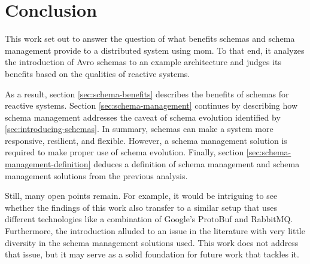 
\section{Conclusion}\label{sec:conclusion}

This work set out to answer the question of what benefits schemas and schema management provide to a distributed system using \gls{mom}.
To that end, it analyzes the introduction of Avro schemas to an example architecture and judges its benefits based on the qualities of reactive systems.

As a result, section \ref{sec:schema-benefits} describes the benefits of schemas for reactive systems.
Section \ref{sec:schema-management} continues by describing how schema management addresses the caveat of schema evolution identified by \ref{sec:introducing-schemas}.
In summary, schemas can make a system more responsive, resilient, and flexible.
However, a schema management solution is required to make proper use of schema evolution.
Finally, section \ref{sec:schema-management-definition} deduces a definition of schema management and schema management solutions from the previous analysis.

Still, many open points remain.
For example, it would be intriguing to see whether the findings of this work also transfer to a similar setup that uses different technologies like a combination of Google's ProtoBuf and RabbitMQ.
Furthermore, the introduction alluded to an issue in the literature with very little diversity in the schema management solutions used.
This work does not address that issue, but it may serve as a solid foundation for future work that tackles it.
